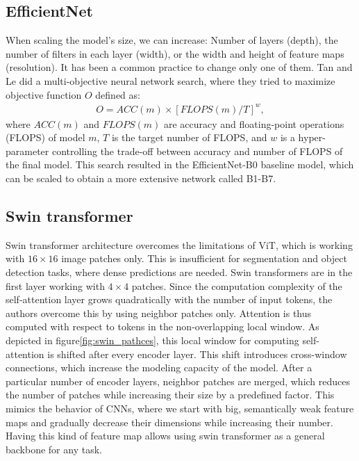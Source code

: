 \subsection{EfficientNet}
When scaling the model's size, we can increase: Number of layers (depth), the number of filters in each layer (width), or the width and height of feature maps (resolution). It has been a common practice to change only one of them. Tan and Le \cite{Tan2019a} did a multi-objective neural network search, where they tried to maximize objective function $O$ defined as:
\begin{align}
    O = ACC \left( m \right) \times \left[ FLOPS \left(m \right) / T \right] ^w,
\end{align}
where $ACC(m)$ and $FLOPS(m)$ are accuracy and floating-point operations (FLOPS) of model $m$, $T$ is the target number of FLOPS, and $w$ is a hyper-parameter controlling the trade-off between accuracy and number of FLOPS of the final model. This search resulted in the EfficientNet-B0 baseline model, which can be scaled to obtain a more extensive network called B1-B7.

\subsection{Swin transformer}
Swin transformer architecture overcomes the limitations of ViT, which is working with $16 \times 16$ image patches only. This is insufficient for segmentation and object detection tasks, where dense predictions are needed. Swin transformers are in the first layer working with $4 \times 4$ patches. Since the computation complexity of the self-attention layer grows quadratically with the number of input tokens, the authors overcome this by using neighbor patches only. Attention is thus computed with respect to tokens in the non-overlapping local window. As depicted in figure\ref{fig:swin_pathces}, this local window for computing self-attention is shifted after every encoder layer. This shift introduces cross-window connections, which increase the modeling capacity of the model. After a particular number of encoder layers, neighbor patches are merged, which reduces the number of patches while increasing their size by a predefined factor. This mimics the behavior of CNNs, where we start with big, semantically weak feature maps and gradually decrease their dimensions while increasing their number. Having this kind of feature map allows using swin transformer as a general backbone for any task. \cite{Liu2021}

